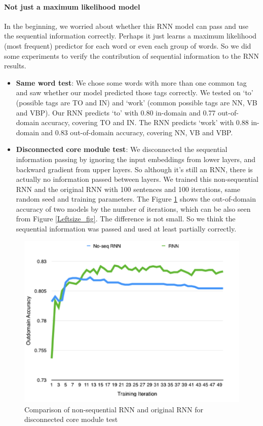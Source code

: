 \documentclass[11pt]{article}
\begin{document}
\paragraph{Not just a maximum likelihood model}
In the beginning, we worried about whether this RNN model can pass and use the sequential information correctly. Perhaps it just learns a maximum likelihood (most frequent) predictor for each word or even each group of words. So we did some experiments to verify the contribution of sequential information to the RNN results.

\begin{itemize}
\item \textbf{Same word test}:  We chose some words with more than one common tag and saw whether our model predicted those tags correctly. We tested on `to' (possible tags are TO and IN) and `work' (common possible tags are NN, VB and VBP). Our RNN predicts `to' with 0.80 in-domain and 0.77 out-of-domain accuracy, covering TO and IN. The RNN predicts `work' with 0.88 in-domain and 0.83 out-of-domain accuracy, covering NN, VB and VBP.
\item \textbf{Disconnected core module test}: We disconnected the sequential information passing by ignoring the input embeddings from lower layers, and backward gradient from upper layers. So although it's still an RNN, there is actually no information passed between layers. We trained this non-sequential RNN and the original RNN with 100 sentences and 100 iterations, same random seed and training parameters. The Figure \ref{Noseq_fig} shows the out-of-domain accuracy of two models by the number of iterations, which can be also seen from Figure \ref{Leftsize_fig}. The difference is not small. So we think the sequential information was passed and used at least partially correctly.
\end{itemize}
\begin{figure}
\includegraphics[scale=0.5]{outdomain_noseq.png}
\caption{Comparison of non-sequential RNN and original RNN for disconnected core module test}\label{Noseq_fig}
\end{figure}
\end{document}
